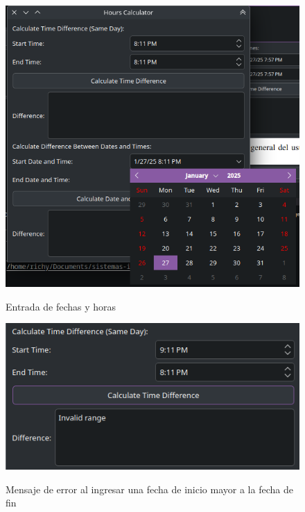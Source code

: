 \documentclass[conference]{IEEEtran}
\begin{document}
    \begin{figure}[H]
        {\includegraphics[width=\breite\columnwidth]{images/calendar.png}}
        \caption{Entrada de fechas y horas}
        \label{fig:calendar}
    \end{figure}
    
    \begin{figure}[H]
        {\includegraphics[width=\breite\columnwidth]{images/error1.png}}
        \caption{Mensaje de error al ingresar una fecha de inicio mayor a la fecha de fin}
        \label{fig:error1}
    \end{figure}
    
\end{document}
